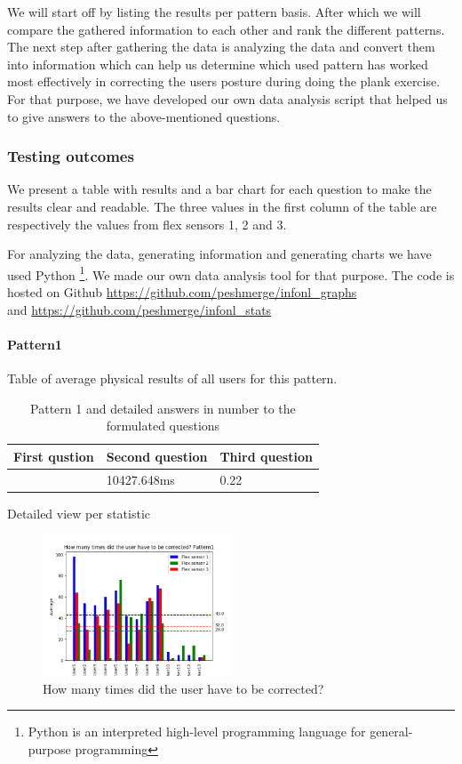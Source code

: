 \documentclass[sigconf]{acmart}
\begin{document}
We will start off by listing the results per pattern basis. After which we will compare the gathered information to each other and rank the different patterns. The next step after gathering the data is analyzing the data and convert them into information which can help us determine which used pattern has worked most effectively in correcting the user\textquotesingle s posture during doing the plank exercise. For that purpose, we have developed our own data analysis script that helped us to give answers to the above-mentioned questions. 

\subsubsection{Testing outcomes} 
We present a table with results and a bar chart for each question to make the results clear and readable. The three values in the first column of the table are respectively the values from flex sensors 1, 2 and 3.

For analyzing the data, generating information and generating charts we have used Python \footnote{Python is an interpreted high-level programming language for general-purpose programming}. We made our own data analysis tool for that purpose. 
The code is hosted on Github 
\url{https://github.com/peshmerge/infonl_graphs}\\ and 
\url{https://github.com/peshmerge/infonl_stats}



\paragraph {Pattern1}
Table of average physical results of all users for this pattern.
\begin{table}[h!]
\caption{Pattern 1 and detailed answers in number to the formulated questions}
\label{my-label}
\begin{tabular}{|l|l|l|}
\hline
\multicolumn{1}{|c|}{\textbf{First qustion}} & \multicolumn{1}{c|}{\textbf{Second question}} & \multicolumn{1}{c|}{\textbf{Third question}} \\ \hline
 [43.0,28.0,32.0]& 10427.648ms &0.22%
\end{tabular}
\end{table}

Detailed view per statistic
\begin{figure}[h!]
\centering
\includegraphics[width=0.5\textwidth, scale=1]{p1_q1.png}
\caption{How many times did the user have to be corrected?}
\end{figure}
\end{document}
